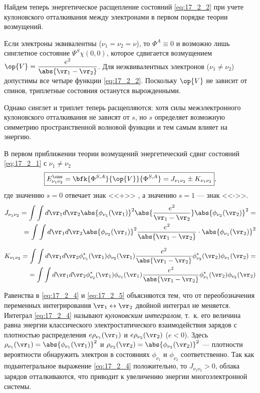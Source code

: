 Найдем теперь энергетическое расщепление состояний \eqref{eq:17_2_2} при учете кулоновского отталкивания между электронами в первом порядке теории возмущений.

Если электроны эквивалентны ($\nu_1 = \nu_2= \nu$), то $\Phi^A \equiv 0$ и возможно лишь синглетное состояние $\Psi^S \chi(0, 0)$, которое сдвигается возмущением ${\op{V} = \dfrac{e^2}{\abs{\vr_1 - \vr_2}}}$. Для неэквивалентных электронов ($\nu_1 \neq \nu_2$) допустимы все четыре функции \eqref{eq:17_2_2}. Поскольку $\op{V}$ не зависит от спинов, триплетные состояния останутся вырожденными.

Однако синглет и триплет теперь расщепляются: хотя силы межэлектронного кулоновского отталкивания не зависят от $s$, но $s$ определяет возможную симметрию пространственной волновой функции и тем самым влияет на энергию.

В первом приближении теории возмущений энергетический сдвиг состояний \eqref{eq:17_2_1} с $\nu_1 \neq \nu_2$
\begin{equation}
\label{eq:17_2_3}
\boxed{E_{\nu_1 \nu_2}^\one = \bfk{\Phi^{S, A}}{\op{V}}{\Phi^{S, A}} = J_{\nu_1 \nu_2} \pm K_{\nu_1 \nu_2}},
\end{equation}
где значению $s = 0$ отвечает знак <<+>> , а значению $s = 1$ --- знак <<->>.
\begin{eqnarray}
\label{eq:17_2_4}
J_{\nu_1 \nu_2} = \int \int d\vr_1 d\vr_2 \abs{\phi_{\nu_1}(\vr_1)}^2 \abs{\frac{e^2}{\vr_1 - \vr_2}} \abs{\phi_{\nu_2}(\vr_2)}^2 = \nonumber \\ = \int \int d\vr_1 d\vr_2 \abs{\phi_{\nu_2}(\vr_1)}^2 \frac{e^2}{\abs{\vr_1 - \vr_2}} \cdot \abs{\phi_{\nu_1}(\vr_2)}^2
\end{eqnarray}

\begin{eqnarray}
\label{eq:17_2_5}
K_{\nu_1 \nu_2} = \int \int d\vr_1 d\vr_2 \phi^*_{\nu_1}(\vr_1) \phi_{\nu_2}(\vr_1)\frac{e^2}{\abs{\vr_1 - \vr_2}}  \phi^*_{\nu_2}(\vr_2) \phi_{\nu_1}(\vr_2) = \nonumber \\
= \int \int d\vr_1 d\vr_2 \phi^*_{\nu_2}(\vr_1) \phi_{\nu_1}(\vr_1)\frac{e^2}{\abs{\vr_1 - \vr_2}}  \phi^*_{\nu_1}(\vr_2) \phi_{\nu_2}(\vr_2)
\end{eqnarray}

Равенства в \eqref{eq:17_2_4} и \eqref{eq:17_2_5} объясняются тем, что от переобозначения переменных интегрирования $\vr_1 \leftrightarrow \vr_2$ двойной интеграл не меняется. Интеграл \eqref{eq:17_2_4} называют {\em кулоновским интегралом}, т.~к. его величина равна энергии классического электростатического взаимодействия зарядов с плотностью распределения $e\rho_{\nu_1}(\vr_1)$ и $e\rho_{\nu_2}(\vr_2)$ ($e < 0$). Здесь $\rho_{\nu_1}(\vr_1) = \abs{\phi_{\nu_1}(\vr_1)}^2$ и $\rho_{\nu_2}(\vr_2) = \abs{\phi_{\nu_2}(\vr_2)}^2$ --- плотности вероятности обнаружить электрон в состояниях $\phi_{\nu_1}$ и $\phi_{\nu_2}$ соответственно. Так как подынтегральное выражение \eqref{eq:17_2_4} положительно, то $J_{\nu_1 \nu_2} > 0$, облака зарядов отталкиваются, что приводит к увеличению энергии многоэлектронной системы.

